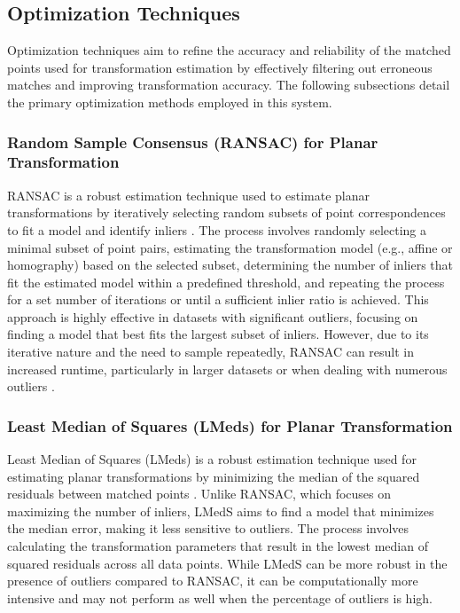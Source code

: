 \subsection{Optimization Techniques}
\label{sec:Optimization Techniques}

Optimization techniques aim to refine the accuracy and reliability of the matched points used for transformation estimation by effectively filtering out erroneous matches and improving transformation accuracy. The following subsections detail the primary optimization methods employed in this system.

\subsubsection{Random Sample Consensus (RANSAC) for Planar Transformation}

RANSAC is a robust estimation technique used to estimate planar transformations by iteratively selecting random subsets of point correspondences to fit a model and identify inliers \cite{fisher2002ransac}. The process involves randomly selecting a minimal subset of point pairs, estimating the transformation model (e.g., affine or homography) based on the selected subset, determining the number of inliers that fit the estimated model within a predefined threshold, and repeating the process for a set number of iterations or until a sufficient inlier ratio is achieved. This approach is highly effective in datasets with significant outliers, focusing on finding a model that best fits the largest subset of inliers. However, due to its iterative nature and the need to sample repeatedly, RANSAC can result in increased runtime, particularly in larger datasets or when dealing with numerous outliers \cite{fisher2002ransac}.

\subsubsection{Least Median of Squares (LMeds) for Planar Transformation}

Least Median of Squares (LMeds) is a robust estimation technique used for estimating planar transformations by minimizing the median of the squared residuals between matched points \cite{farin2005video}. Unlike RANSAC, which focuses on maximizing the number of inliers, LMedS aims to find a model that minimizes the median error, making it less sensitive to outliers. The process involves calculating the transformation parameters that result in the lowest median of squared residuals across all data points. While LMedS can be more robust in the presence of outliers compared to RANSAC, it can be computationally more intensive and may not perform as well when the percentage of outliers is high.


